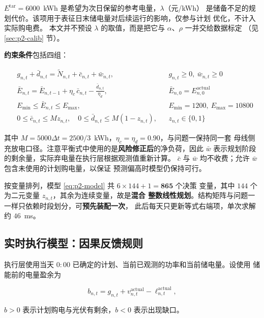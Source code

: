 \documentclass[withoutpreface,bwprint]{cumcmthesis}
\begin{document}
$E^{\mathrm{tar}}=6000$~kWh 是希望为次日保留的参考电量，$\lambda$（元/kWh）
是储备不足的规划代价。该项用于表征日末储电量对后续运行的影响，仅参与计划
优化，不计入实际购电费。
本文并不预设 $\lambda$ 的取值，而是把它与 $\alpha$、$\rho$ 一并交给数据标定
（见 \ref{sec:p2-calib} 节）。

\textbf{约束条件}包括四组：

\begin{equation}
\begin{aligned}
  & g_{n,t}+\bar d_{n,t}=\widetilde N_{n,t}+\bar c_{n,t}+\bar w_{n,t},
  && g_{n,t}\ge0,\ \bar w_{n,t}\ge0 \\
  & \bar E_{n,t}=\bar E_{n,t-1}+\eta_c\,\bar c_{n,t}
    -\frac{\bar d_{n,t}}{\eta_d},
  && \bar E_{n,0}=E_{n,0}^{\mathrm{actual}} \\
  & E_{\min}\le\bar E_{n,t}\le E_{\max},
  && E_{\min}=1200,\ E_{\max}=10800 \\
  & 0\le\bar c_{n,t}\le M z_{n,t},\quad
    0\le\bar d_{n,t}\le M(1-z_{n,t}),
  && z_{n,t}\in\{0,1\}
\end{aligned}
\label{eq:p2-model}
\end{equation}

其中 $M=5000\Delta t=2500/3$~kWh，$\eta_c=\eta_d=0.90$，与问题一保持同一套
母线侧充放电口径。注意平衡式中使用的是\textbf{风险修正后}的净负荷，因此
$\bar w$ 表示规划阶段的剩余量，实际弃电量在执行层根据观测值重新计算。
$\bar c$ 与 $\bar w$ 均不收费；允许 $\bar w$ 包含未使用的计划购电量，以保证
预测偏高时模型仍保持可行。

按变量排列，模型 \eqref{eq:p2-model} 共 $6\times144+1=\mathbf{865}$ 个决策
变量，其中 $144$ 个为二元变量 $z_{n,t}$，其余为连续变量，故是\textbf{混合
整数线性规划}。结构矩阵与问题一一样只依赖时段划分，可\textbf{预先装配一次}，
此后每天只更新等式右端项，单次求解约 $46$~ms。

\subsection{实时执行模型：因果反馈规则}

执行层使用当天 $0{:}00$ 已确定的计划、当前已观测的功率和当前储电量。设使用
储能前的电量盈余为

\begin{equation}
  b_{n,t}=g_{n,t}+v_{n,t}^{\mathrm{actual}}-\ell_{n,t}^{\mathrm{actual}} ,
  \label{eq:p2-surplus}
\end{equation}

$b>0$ 表示计划购电与光伏有剩余，$b<0$ 表示出现缺口。
\end{document}
